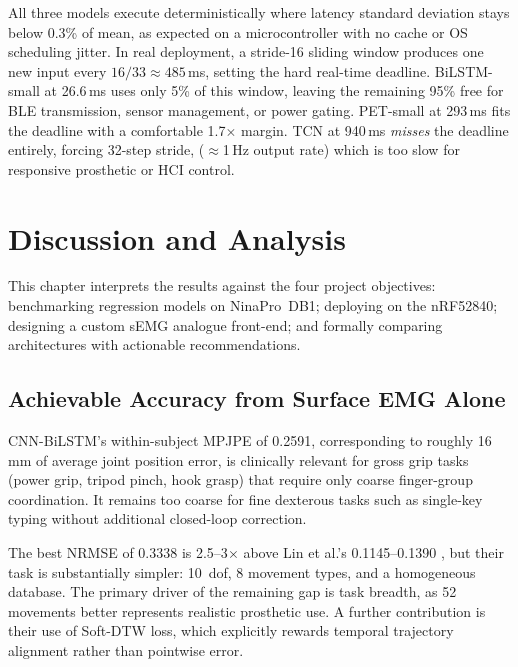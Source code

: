 \documentclass[11pt]{article}
\begin{document}
All three models execute deterministically where latency standard deviation stays below 0.3\% of mean, as expected on a microcontroller with no cache or OS scheduling jitter. In real deployment, a stride-16 sliding window produces one new input every $16/33\approx485$\,ms, setting the hard real-time deadline. BiLSTM-small at 26.6\,ms uses only 5\% of this window, leaving the remaining 95\% free for BLE transmission, sensor management, or power gating. PET-small at 293\,ms fits the deadline with a comfortable 1.7$\times$ margin. TCN at 940\,ms \emph{misses} the deadline entirely, forcing 32-step stride, (${\approx}$1\,Hz output rate) which is too slow for responsive prosthetic or HCI control.

\section{Discussion and Analysis}
\label{sec:discussion}

This chapter interprets the results against the four project objectives: benchmarking regression models on NinaPro~DB1; deploying on the nRF52840; designing a custom sEMG analogue front-end; and formally comparing architectures with actionable recommendations.

\subsection{Achievable Accuracy from Surface EMG Alone}
\label{sec:disc_feasibility}

CNN-BiLSTM's within-subject MPJPE of 0.2591, corresponding to roughly 16\,mm of average joint position error, is clinically relevant for gross grip tasks (power grip, tripod pinch, hook grasp) that require only coarse finger-group coordination. It remains too coarse for fine dexterous tasks such as single-key typing without additional closed-loop correction.

The best NRMSE of 0.3338 is 2.5--3$\times$ above Lin et al.'s 0.1145--0.1390 \cite{lin2025parallel}, but their task is substantially simpler: 10~\gls{dof}, 8 movement types, and a homogeneous database. The primary driver of the remaining gap is task breadth, as 52 movements better represents realistic prosthetic use. A further contribution is their use of Soft-DTW loss, which explicitly rewards temporal trajectory alignment rather than pointwise error.
\end{document}
